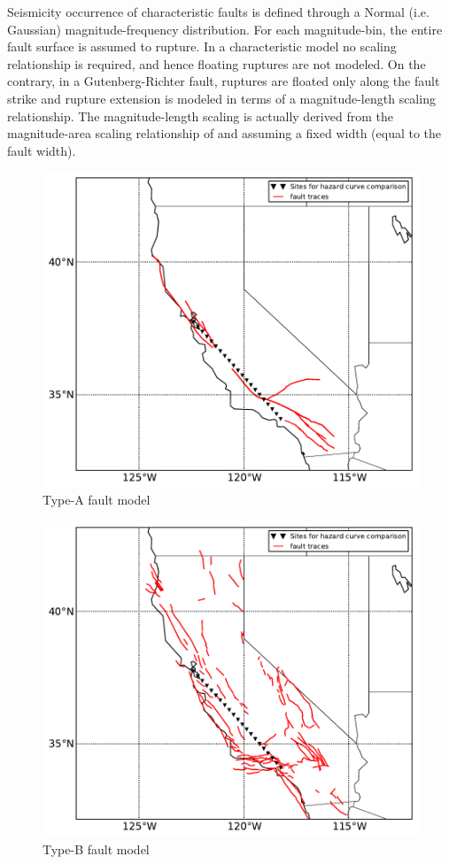Seismicity occurrence of characteristic faults is defined through a Normal (i.e.
Gaussian) magnitude-frequency distribution. For each magnitude-bin, the entire
fault surface is assumed to rupture. In a characteristic model no scaling
relationship is required, and hence floating ruptures are not modeled. 
%
On the contrary, in a Gutenberg-Richter fault, ruptures are floated only along
the fault strike and rupture extension is modeled in terms of a magnitude-length
scaling relationship. The magnitude-length scaling is actually derived from the
magnitude-area scaling relationship of \citet{hanks2002} and assuming a fixed
width (equal to the fault width).
%
\begin{figure}[!hb]
\centering
\includegraphics[width=12cm]{./qareport/pictures/aFault_aPriori_D2pt1.pdf}
\caption{Type-A fault model}
\label{fig:type_a_fault}
\end{figure}
%
\begin{figure}[!hb]
\centering
\includegraphics[width=12cm]{./qareport/pictures/bFault_stitched_D2pt1_GR0.pdf}
\caption{Type-B fault model}
\label{fig:type_b_fault}
\end{figure}
